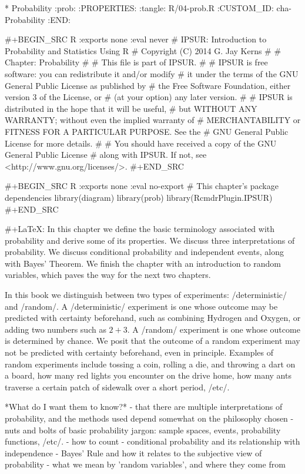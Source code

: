 * Probability                                                          :prob:
:PROPERTIES:
:tangle: R/04-prob.R
:CUSTOM_ID: cha-Probability
:END:

#+BEGIN_SRC R :exports none :eval never
#    IPSUR: Introduction to Probability and Statistics Using R
#    Copyright (C) 2014  G. Jay Kerns
#
#    Chapter: Probability
#
#    This file is part of IPSUR.
#
#    IPSUR is free software: you can redistribute it and/or modify
#    it under the terms of the GNU General Public License as published by
#    the Free Software Foundation, either version 3 of the License, or
#    (at your option) any later version.
#
#    IPSUR is distributed in the hope that it will be useful,
#    but WITHOUT ANY WARRANTY; without even the implied warranty of
#    MERCHANTABILITY or FITNESS FOR A PARTICULAR PURPOSE.  See the
#    GNU General Public License for more details.
#
#    You should have received a copy of the GNU General Public License
#    along with IPSUR.  If not, see <http://www.gnu.org/licenses/>.
#+END_SRC

#+BEGIN_SRC R :exports none :eval no-export
# This chapter's package dependencies
library(diagram)
library(prob)
library(RcmdrPlugin.IPSUR)
#+END_SRC

#+LaTeX: \noindent 
In this chapter we define the basic terminology associated with
probability and derive some of its properties. We discuss three
interpretations of probability. We discuss conditional probability and
independent events, along with Bayes' Theorem. We finish the chapter
with an introduction to random variables, which paves the way for the
next two chapters.

In this book we distinguish between two types of experiments:
/deterministic/ and /random/. A /deterministic/ experiment is one
whose outcome may be predicted with certainty beforehand, such as
combining Hydrogen and Oxygen, or adding two numbers such as
\(2+3\). A /random/ experiment is one whose outcome is determined by
chance. We posit that the outcome of a random experiment may not be
predicted with certainty beforehand, even in principle. Examples of
random experiments include tossing a coin, rolling a die, and throwing
a dart on a board, how many red lights you encounter on the drive
home, how many ants traverse a certain patch of sidewalk over a short
period, /etc/.

 *What do I want them to know?*
- that there are multiple interpretations of probability, and the
  methods used depend somewhat on the philosophy chosen
- nuts and bolts of basic probability jargon: sample spaces, events,
  probability functions, /etc/.
- how to count
- conditional probability and its relationship with independence
- Bayes' Rule and how it relates to the subjective view of probability
- what we mean by 'random variables', and where they come from

